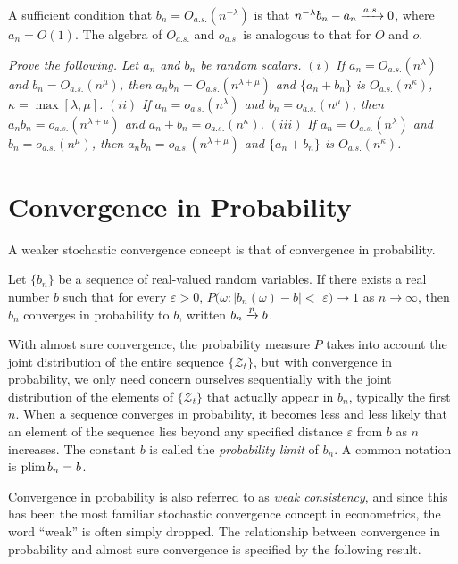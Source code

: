 A sufficient condition that $b_n = O_{a.s.}(n^{-\lambda})$ is that $n^{-\lambda}b_n - a_n \xrightarrow{a.s.} 0$,
where $a_n = O(1)$. The algebra of $O_{a.s.}$ and $o_{a.s.}$ is analogous to that for $O$
and $o$.

\begin{exercises}
\item\label{ex:2.22} \emph{Prove the following. Let $a_n$ and $b_n$ be random scalars.} $(i)$ \emph{If
$a_n = O_{a.s.}(n^{\lambda})$ and $b_n = O_{a.s.}(n^{\mu})$, then $a_nb_n = O_{a.s.}(n^{\lambda+\mu})$ and $\{a_n + b_n\}$
is $O_{a.s.}(n^{\kappa})$, $\kappa = \max[\lambda,\mu]$.} $(ii)$ \emph{If $a_n = o_{a.s.}(n^{\lambda})$ and $b_n = o_{a.s.}(n^{\mu})$, then
$a_nb_n = o_{a.s.}(n^{\lambda+\mu})$ and $a_n + b_n = o_{a.s.}(n^{\kappa})$.} $(iii)$ \emph{If $a_n = O_{a.s.}(n^{\lambda})$ and
$b_n = o_{a.s.}(n^{\mu})$, then $a_nb_n = o_{a.s.}(n^{\lambda+\mu})$ and $\{a_n + b_n\}$ is $O_{a.s.}(n^{\kappa})$.}
\end{exercises}

\section{Convergence in Probability}\label{sec:conv-probability}

A weaker stochastic convergence concept is that of convergence in probability.

\begin{definition}\label{def:conv-probability}
Let $\{b_n\}$ be a sequence of real-valued random variables.
If there exists a real number $b$ such that for every $\varepsilon > 0$, $P(\omega : |b_n(\omega) - b| <$
$\varepsilon) \to 1$ as $n \to \infty$, then $b_n$ converges in probability to $b$, written $b_n \xrightarrow{p} b$.
\end{definition}

With almost sure convergence, the probability measure $P$ takes into account the joint distribution of the entire sequence $\{\mathcal{Z}_t\}$, but with convergence in probability, we only need concern ourselves sequentially with the
joint distribution of the elements of $\{\mathcal{Z}_t\}$ that actually appear in $b_n$, typically the first $n$. When a sequence converges in probability, it becomes less
and less likely that an element of the sequence lies beyond any specified
distance $\varepsilon$ from $b$ as $n$ increases. The constant $b$ is called the \emph{probability
limit} of $b_n$. A common notation is $\operatorname{plim} b_n = b$.

Convergence in probability is also referred to as \emph{weak consistency}, and
since this has been the most familiar stochastic convergence concept in
econometrics, the word ``weak'' is often simply dropped. The relationship
between convergence in probability and almost sure convergence is specified
by the following result.

